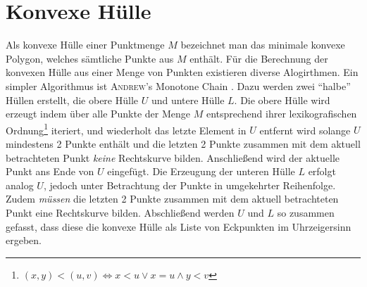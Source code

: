 \section*{Konvexe Hülle}
\writtenby{\dcauthornameewie}%
Als konvexe Hülle einer Punktmenge $M$ bezeichnet man das minimale konvexe Polygon, welches sämtliche Punkte aus $M$ enthält.
Für die Berechnung der konvexen Hülle aus einer Menge von Punkten existieren diverse Alogirthmen.
Ein simpler Algorithmus ist \textsc{Andrew}'s Monotone Chain  \cite[6--7]{compgeom2008}.
Dazu werden zwei "`halbe"' Hüllen erstellt, die obere Hülle $U$ und untere Hülle $L$.
Die obere Hülle wird erzeugt indem über alle Punkte der Menge $M$ entsprechend ihrer lexikografischen Ordnung\footnote{
  \( (x,y) < (u, v) \Longleftrightarrow x < u \vee x = u \wedge y < v \)
} iteriert, und wiederholt das letzte Element in $U$ entfernt wird solange $U$ mindestens 2 Punkte enthält und die letzten 2 Punkte zusammen mit dem aktuell betrachteten Punkt \emph{keine} Rechtskurve bilden.
Anschließend wird der aktuelle Punkt ans Ende von $U$ eingefügt.
Die Erzeugung der unteren Hülle $L$ erfolgt analog $U$, jedoch unter Betrachtung der Punkte in umgekehrter Reihenfolge.
Zudem \emph{müssen} die letzten 2 Punkte zusammen mit dem aktuell betrachteten Punkt eine Rechtskurve bilden.
Abschließend werden $U$ und $L$ so zusammen gefasst, dass diese die konvexe Hülle als Liste von Eckpunkten im Uhrzeigersinn ergeben.

